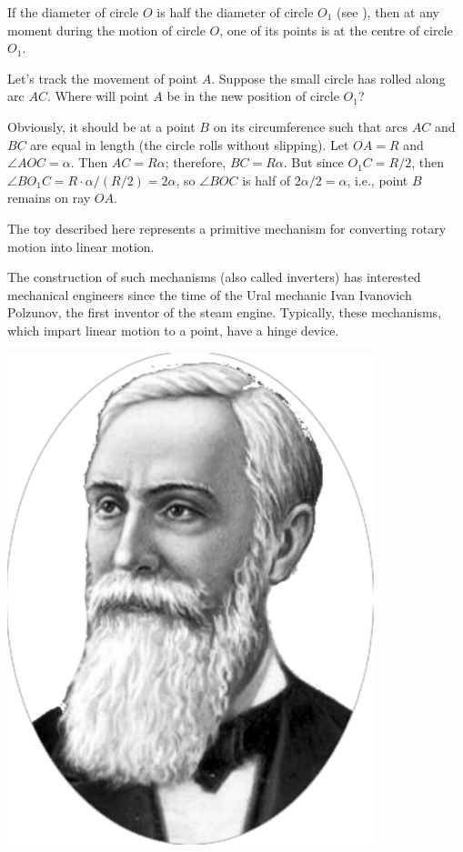 \ans If the diameter of circle $O$ is half the diameter of circle $O_{1}$ (see ), then at any moment during the motion of circle $O$, one of its points is at the centre of circle $O_{1}$.

Let's track the movement of point $A$. Suppose the small circle has rolled along arc $AC$. Where will point $A$ be in the new position of circle $O_{1}$?

Obviously, it should be at a point $B$ on its circumference such that arcs $AC$ and $BC$ are equal in length (the circle rolls without slipping). Let $OA = R$ and $\angle AOC = \alpha$. Then $AC = R\alpha$; therefore, $BC = R \alpha$. But since $O_{1}C = R/2$, then $\angle BO_{1}C = R \cdot \alpha/(R/2) = 2 \alpha$, so $\angle BOC$ is half of $2 \alpha/2 = \alpha$, i.e., point $B$ remains on ray $OA$.

The toy described here represents a primitive mechanism for converting rotary motion into linear motion.

The construction of such mechanisms (also called inverters) has interested mechanical engineers since the time of the Ural mechanic Ivan Ivanovich Polzunov, the first inventor of the steam engine. Typically, these mechanisms, which impart linear motion to a point, have a hinge device. 


\begin{marginfigure}[-2cm]%
\centering
\includegraphics[width=0.8\textwidth]{figures/ch-09/fig-134a.pdf}
\end{marginfigure}


